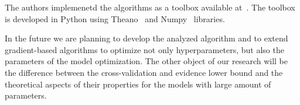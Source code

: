 The authors  implemenetd the algorithms as a toolbox available at~\cite{pyfos}. The toolbox is developed in Python using Theano~\cite{theano} and Numpy~\cite{numpy} libraries. 

In the future we are planning to develop the analyzed algorithm and to extend gradient-based algorithms to optimize not only hyperparameters, but also the parameters of the model optimization. The other object of our research will be the difference between the cross-validation and evidence lower bound and the theoretical aspects of their properties for the models with large amount of parameters.

